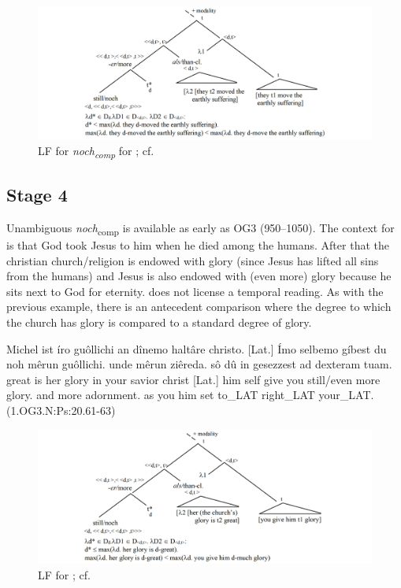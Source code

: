 \documentclass[output=paper]{langsci/langscibook}
\begin{document}
\begin{figure}
\includegraphics[width=1\textwidth]{figures/LF2_comp}
\caption{LF for \textit{noch\textsubscript{comp}} for ; cf. \citep{beck2016a_sub}}
\label{fig:LF2_comp}
\end{figure}

\subsection{Stage 4} Unambiguous \textit{noch}\textsubscript{comp} is available as early as OG3 (950--1050). The context for  is that God took Jesus to him when he died among the humans. After that the christian church/religion is endowed with glory (since Jesus has lifted all sins from the humans) and Jesus is also endowed with (even more) glory because he sits next to God for eternity.  does not license a temporal reading. As with the previous example, there is an antecedent comparison where the degree to which the church has glory is compared to a standard degree of glory.

\ea\gll Michel ist íro guôllichi an dînemo haltâre christo. [Lat.] Ímo selbemo gíbest du noh mêrun guôllichi. unde mêrun ziêreda. sô dû in gesezzest ad dexteram tuam.\\
       great is her glory in your savior christ [Lat.] him self give you still/even more glory. and more adornment. as you him set to\_LAT right\_LAT your\_LAT.\\
\label{OG3_noch_more_glory} \hfill (1.OG3.N:Ps:20.61-63)
\z

\begin{figure}
\includegraphics[width=1\textwidth]{figures/LF3_comp}
\caption{LF for ; cf. \citep{beck2016a_sub}}
\label{fig:LF3_comp}
\end{figure}
\end{document}
